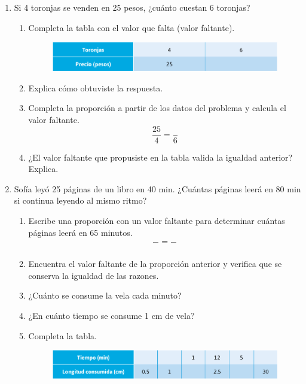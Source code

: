 \documentclass[11pt]{book}
\begin{document}
\begin{enumerate}
  \item Si 4 toronjas se venden en 25 pesos, ¿cuánto cuestan 6 toronjas?
        \begin{enumerate}
          \item Completa la tabla con el valor que falta (valor faltante).
                \begin{figure}[H]
                  \centering
                  \includegraphics[width=0.6\linewidth]{tabla_toronjas.png}
                  \label{tab:tabla_toronjas}
                \end{figure}
          \item Explica cómo obtuviste la respuesta.
          \item Completa la proporción a partir de los datos del problema y calcula el valor faltante.
                \[\dfrac{25}{4} = \dfrac{}{6}\]
          \item ¿El valor faltante que propusiste en la tabla valida la igualdad anterior? Explica.
        \end{enumerate}
  \item Sofía leyó 25 páginas de un libro en 40 min. ¿Cuántas páginas leerá en 80 min si continua leyendo al mismo ritmo?
        \begin{enumerate}
          \item Escribe una proporción con un valor faltante para determinar cuántas páginas leerá en 65 minutos.
                \[\dfrac{\text{ }}{\text{ }} = \dfrac{\text{ }}{\text{ }}\]
          \item Encuentra el valor faltante de la proporción anterior y verifica que se conserva la
                igualdad de las razones.
          \item ¿Cuánto se consume la vela cada minuto?
          \item ¿En cuánto tiempo se consume 1 cm de vela?
          \item Completa la tabla.
                \begin{figure}[H]
                  \centering
                  \includegraphics[width=0.6\linewidth]{tabla_longitud.png}
                  \label{tab:tabla_longitud}
                \end{figure}
        \end{enumerate}


\end{enumerate}
\end{document}
